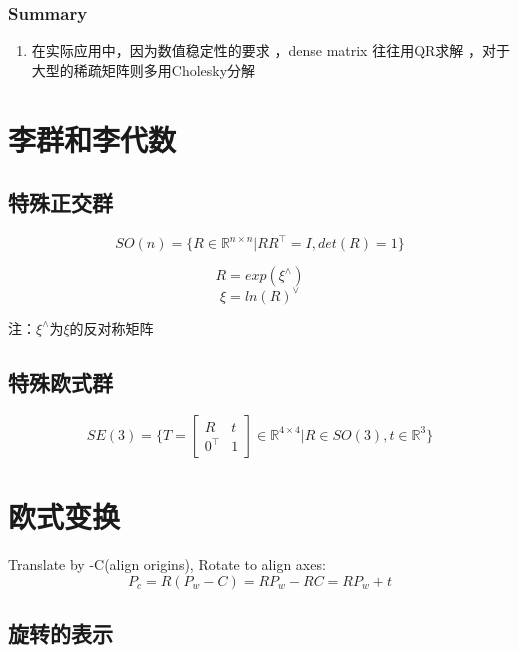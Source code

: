 \subsubsection{Summary}
\begin{enumerate}
\item 在实际应用中，因为数值稳定性的要求 ，dense matrix 往往用QR求解 ，对于 大型的稀疏矩阵则多用Cholesky分解
\end{enumerate}


\section{李群和李代数}

\subsection{特殊正交群}
\begin{equation}
SO(n) = \{ R \in \mathbb{R}^{n \times n} | RR^\top = I, det(R) = 1\}
\end{equation}

\begin{equation} R = exp({\xi}^{\wedge}) \end{equation}
\begin{equation} \xi = ln(R)^{\vee} \end{equation}

注：${\xi}^{\wedge}$为$\xi$的反对称矩阵

\subsection{特殊欧式群}
\begin{equation}
SE(3) = \{ T = \begin{bmatrix} R & t \\ 0^\top & 1 \end{bmatrix} \in \mathbb{R}^{4 \times 4} | R \in SO(3), t \in \mathbb{R}^{3}\}
\end{equation}


\section{欧式变换}
Translate by -C(align origins), Rotate to align axes:
\begin{equation} P_c = R (P_w - C) = RP_w - RC = RP_w + t \end{equation}

\subsection{旋转的表示}

